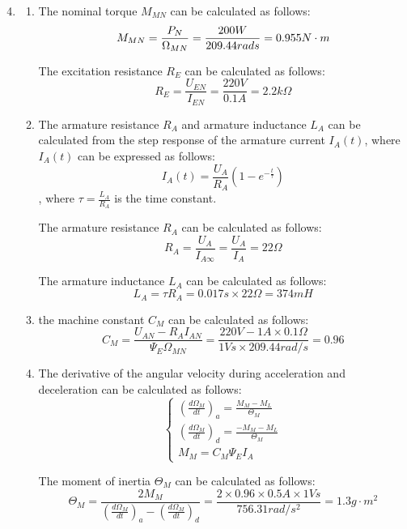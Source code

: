 \documentclass[12pt,a4paper, openany]{book}
\begin{document}
\begin{enumerate}
\setcounter{enumi}{3} %
\item {\bf *} 

\begin{enumerate}
\item {\bf} 
The nominal torque $M_{MN}$ can be calculated as follows:
\begin{equation}
    M_{MN} = \frac{P_{N}}{\Omega_{MN}} = \frac{200W}{209.44rad\/s} = 0.955 N\cdot m
\end{equation}

The excitation resistance $R_E$ can be calculated as follows:
\begin{equation}
    R_E = \frac{U_{EN}}{I_{EN}} = \frac{220V}{0.1A} = 2.2k\Omega
\end{equation}
\item {\bf} 
The armature resistance $R_A$ and armature inductance $L_A$ can be calculated from the step response of the armature current $I_A(t)$, where $I_A(t)$ can be expressed as follows:
\begin{equation}
    I_A(t) = \frac{U_A}{R_A} \left(1 - e^{-\frac{t}{\tau}}\right)
\end{equation}
, where $\tau = \frac{L_A}{R_A}$ is the time constant.

The armature resistance $R_A$ can be calculated as follows:
\begin{equation}
    R_A = \frac{U_A}{I_{A\infty}} = \frac{U_A}{I_A}= 22 \Omega
\end{equation}

The armature inductance $L_A$ can be calculated as follows:
\begin{equation}
    L_A = \tau R_A = 0.017s \times 22 \Omega = 374mH    
\end{equation}
\item {\bf}  the machine constant $C_M$ can be calculated as follows:
\begin{equation}
    C_M = \frac{U_{AN} - R_A I_{AN}}{\Psi_E \Omega_{MN}} = \frac{220V-1A\times 0.1\Omega}{1Vs \times 209.44rad/s} = 0.96
\end{equation}
\item {\bf} 
The derivative of the angular velocity during acceleration and deceleration can be calculated as follows:
\begin{equation}
    \begin{cases}
        (\frac{d\Omega_M}{dt})_a = \frac{M_M - M_L}{\Theta_M} \\
        (\frac{d\Omega_M}{dt})_d = \frac{-M_M-M_L}{\Theta_M} \\
        M_M = C_M \Psi_E I_A
    \end{cases}
\end{equation}

The moment of inertia $\Theta_M$ can be calculated as follows:
\begin{equation}
    \Theta_M = \frac{2M_M}{(\frac{d\Omega_M}{dt})_a - (\frac{d\Omega_M}{dt})_d} = 
    \frac{2\times 0.96 \times 0.5A \times 1Vs}{756.31rad/s^2} = 1.3 g\cdot m^2
\end{equation}
\end{enumerate}
\end{enumerate}
\end{document}
